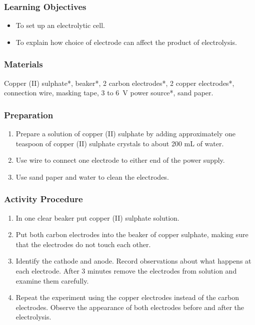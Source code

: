 \subsubsection*{Learning Objectives}
\begin{itemize}
\item{To set up an electrolytic cell.}
\item{To explain how choice of electrode can affect the product of electrolysis.}
\end{itemize}

\subsubsection*{Materials}
Copper (II) sulphate*, beaker*, 2 carbon electrodes*, 2 copper electrodes*, connection wire, masking tape, 3 to 6~V power source*, sand paper.

\subsubsection*{Preparation}
\begin{enumerate}
\item{Prepare a solution of copper (II) sulphate by adding approximately one teaspoon of copper (II) sulphate crystals to about 200 mL of water.}
\item{Use wire to connect one electrode to either end of the power supply.}
\item{Use sand paper and water to clean the electrodes.}
\end{enumerate}

\subsubsection*{Activity Procedure}
\begin{enumerate}
\item{In one clear beaker put copper (II) sulphate solution.}
\item{Put both carbon electrodes into the beaker of copper sulphate, making sure that the electrodes do not touch each other.}
\item{Identify the cathode and anode. Record observations about what happens at each electrode. After 3 minutes remove the electrodes from solution and examine them carefully.}
\item{Repeat the experiment using the copper electrodes instead of the carbon electrodes. Observe the appearance of both electrodes before and after the electrolysis.}
\end{enumerate}


